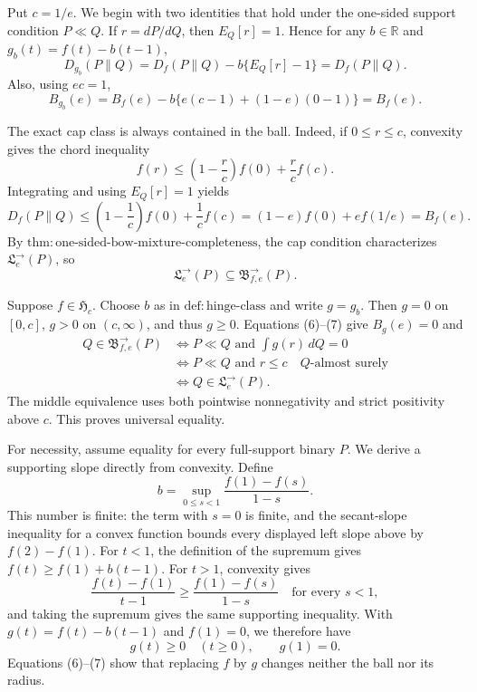 Put \(c=1/e\).  We begin with two identities that hold under the one-sided support condition \(P\ll Q\).  If \(r=dP/dQ\), then \(E_Q[r]=1\).  Hence for any \(b\in\mathbb R\) and \(g_b(t)=f(t)-b(t-1)\),
\[
 D_{g_b}(P\|Q)=D_f(P\|Q)-b\{E_Q[r]-1\}=D_f(P\|Q). \tag{6}
\]
Also, using \(ec=1\),
\[
 B_{g_b}(e)=B_f(e)-b\{e(c-1)+(1-e)(0-1)\}=B_f(e). \tag{7}
\]

The exact cap class is always contained in the ball.  Indeed, if \(0\le r\le c\), convexity gives the chord inequality
\[
 f(r)\le \left(1-\frac r c\right)f(0)+\frac r c f(c).
\]
Integrating and using \(E_Q[r]=1\) yields
\[
 D_f(P\|Q)\le \left(1-\frac1c\right)f(0)+\frac1c f(c)
 =(1-e)f(0)+ef(1/e)=B_f(e). \tag{8}
\]
By \(\mathrm{thm:one\text{-}sided\text{-}bow\text{-}mixture\text{-}completeness}\), the cap condition characterizes \(\mathfrak L^{\to}_e(P)\), so
\[
 \mathfrak L^{\to}_e(P)\subseteq\mathfrak B^{\to}_{f,e}(P). \tag{9}
\]

Suppose \(f\in\mathfrak H_c\).  Choose \(b\) as in \(\mathrm{def:hinge\text{-}class}\) and write \(g=g_b\).  Then \(g=0\) on \([0,c]\), \(g>0\) on \((c,\infty)\), and thus \(g\ge0\).  Equations (6)--(7) give \(B_g(e)=0\) and
\[
 \begin{aligned}
 Q\in\mathfrak B^{\to}_{f,e}(P)
 &\Longleftrightarrow P\ll Q\text{ and }\int g(r)\,dQ=0\\
 &\Longleftrightarrow P\ll Q\text{ and }r\le c\quad Q\text{-almost surely}\\
 &\Longleftrightarrow Q\in\mathfrak L^{\to}_e(P).
 \end{aligned} \tag{10}
\]
The middle equivalence uses both pointwise nonnegativity and strict positivity above \(c\).  This proves universal equality.

For necessity, assume equality for every full-support binary \(P\).  We derive a supporting slope directly from convexity.  Define
\[
 b=\sup_{0\le s<1}\frac{f(1)-f(s)}{1-s}.
\]
This number is finite: the term with \(s=0\) is finite, and the secant-slope inequality for a convex function bounds every displayed left slope above by \(f(2)-f(1)\).  For \(t<1\), the definition of the supremum gives \(f(t)\ge f(1)+b(t-1)\).  For \(t>1\), convexity gives
\[
 \frac{f(t)-f(1)}{t-1}\ge\frac{f(1)-f(s)}{1-s}
 \quad\text{for every }s<1,
\]
and taking the supremum gives the same supporting inequality.  With \(g(t)=f(t)-b(t-1)\) and \(f(1)=0\), we therefore have
\[
 g(t)\ge0\quad(t\ge0),\qquad g(1)=0. \tag{11}
\]
Equations (6)--(7) show that replacing \(f\) by \(g\) changes neither the ball nor its radius.


